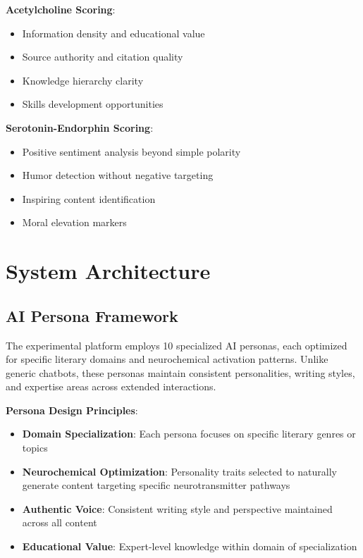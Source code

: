 \documentclass[11pt,letterpaper]{article}
\begin{document}
\textbf{Acetylcholine Scoring}:
\begin{itemize}
    \item Information density and educational value
    \item Source authority and citation quality
    \item Knowledge hierarchy clarity
    \item Skills development opportunities
\end{itemize}

\textbf{Serotonin-Endorphin Scoring}:
\begin{itemize}
    \item Positive sentiment analysis beyond simple polarity
    \item Humor detection without negative targeting
    \item Inspiring content identification
    \item Moral elevation markers
\end{itemize}

\section{System Architecture}

\subsection{AI Persona Framework}

The experimental platform employs 10 specialized AI personas, each optimized for specific literary domains and neurochemical activation patterns. Unlike generic chatbots, these personas maintain consistent personalities, writing styles, and expertise areas across extended interactions.

\textbf{Persona Design Principles}:
\begin{itemize}
    \item \textbf{Domain Specialization}: Each persona focuses on specific literary genres or topics
    \item \textbf{Neurochemical Optimization}: Personality traits selected to naturally generate content targeting specific neurotransmitter pathways
    \item \textbf{Authentic Voice}: Consistent writing style and perspective maintained across all content
    \item \textbf{Educational Value}: Expert-level knowledge within domain of specialization
\end{itemize}
\end{document}
